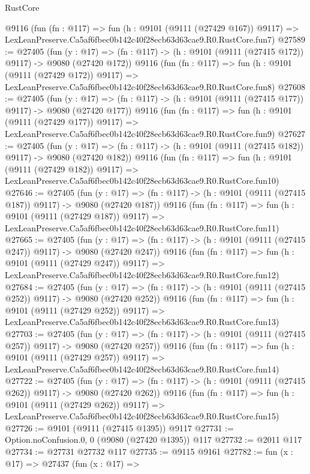 \begin{lexlean}{RustCore}
\begin{coremodule}
    @9116
    (fun (fn : @117) =>
    fun (h : @9101 (@9111 (@27429 @167)) @9117) =>
    LexLeanPreserve.Ca5af6fbec0b142c40f28ecb63d63cae9.R0.RustCore.fun7)
@27589 := @27405
    (fun (y : @17) => (fn : @117) -> (h : @9101 (@9111 (@27415 @172)) @9117) -> @9080 (@27420 @172))
    @9116
    (fun (fn : @117) =>
    fun (h : @9101 (@9111 (@27429 @172)) @9117) =>
    LexLeanPreserve.Ca5af6fbec0b142c40f28ecb63d63cae9.R0.RustCore.fun8)
@27608 := @27405
    (fun (y : @17) => (fn : @117) -> (h : @9101 (@9111 (@27415 @177)) @9117) -> @9080 (@27420 @177))
    @9116
    (fun (fn : @117) =>
    fun (h : @9101 (@9111 (@27429 @177)) @9117) =>
    LexLeanPreserve.Ca5af6fbec0b142c40f28ecb63d63cae9.R0.RustCore.fun9)
@27627 := @27405
    (fun (y : @17) => (fn : @117) -> (h : @9101 (@9111 (@27415 @182)) @9117) -> @9080 (@27420 @182))
    @9116
    (fun (fn : @117) =>
    fun (h : @9101 (@9111 (@27429 @182)) @9117) =>
    LexLeanPreserve.Ca5af6fbec0b142c40f28ecb63d63cae9.R0.RustCore.fun10)
@27646 := @27405
    (fun (y : @17) => (fn : @117) -> (h : @9101 (@9111 (@27415 @187)) @9117) -> @9080 (@27420 @187))
    @9116
    (fun (fn : @117) =>
    fun (h : @9101 (@9111 (@27429 @187)) @9117) =>
    LexLeanPreserve.Ca5af6fbec0b142c40f28ecb63d63cae9.R0.RustCore.fun11)
@27665 := @27405
    (fun (y : @17) => (fn : @117) -> (h : @9101 (@9111 (@27415 @247)) @9117) -> @9080 (@27420 @247))
    @9116
    (fun (fn : @117) =>
    fun (h : @9101 (@9111 (@27429 @247)) @9117) =>
    LexLeanPreserve.Ca5af6fbec0b142c40f28ecb63d63cae9.R0.RustCore.fun12)
@27684 := @27405
    (fun (y : @17) => (fn : @117) -> (h : @9101 (@9111 (@27415 @252)) @9117) -> @9080 (@27420 @252))
    @9116
    (fun (fn : @117) =>
    fun (h : @9101 (@9111 (@27429 @252)) @9117) =>
    LexLeanPreserve.Ca5af6fbec0b142c40f28ecb63d63cae9.R0.RustCore.fun13)
@27703 := @27405
    (fun (y : @17) => (fn : @117) -> (h : @9101 (@9111 (@27415 @257)) @9117) -> @9080 (@27420 @257))
    @9116
    (fun (fn : @117) =>
    fun (h : @9101 (@9111 (@27429 @257)) @9117) =>
    LexLeanPreserve.Ca5af6fbec0b142c40f28ecb63d63cae9.R0.RustCore.fun14)
@27722 := @27405
    (fun (y : @17) => (fn : @117) -> (h : @9101 (@9111 (@27415 @262)) @9117) -> @9080 (@27420 @262))
    @9116
    (fun (fn : @117) =>
    fun (h : @9101 (@9111 (@27429 @262)) @9117) =>
    LexLeanPreserve.Ca5af6fbec0b142c40f28ecb63d63cae9.R0.RustCore.fun15)
@27726 := @9101 (@9111 (@27415 @1395)) @9117
@27731 := Option.noConfusion.{0, 0} (@9080 (@27420 @1395)) @117
@27732 := @2011 @117
@27734 := @27731 @27732 @117
@27735 := @9115 @9161
@27782 := fun (x : @17) =>
  @27437
    (fun (x : @17) =>

\end{coremodule}
\end{lexlean}
